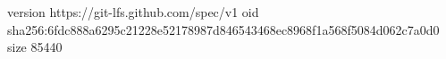 version https://git-lfs.github.com/spec/v1
oid sha256:6fdc888a6295c21228e52178987d846543468ec8968f1a568f5084d062c7a0d0
size 85440
